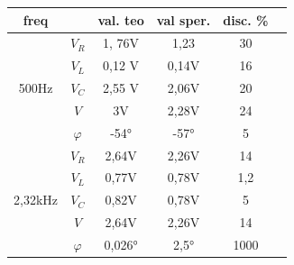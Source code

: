 \documentclass[12pt]{article}
\begin{document}
\begin{center}
    \begin{table}[!h]
        
    
    \begin{tabular}{|c|c|c|c|c|c|}
     \hline
       \rowcolor{nred} freq &  & val. teo & val sper. & disc. \%\\ \hline
       
      \multirow{5}{*}{500Hz} &\cellcolor{norange} $V_R$ & \cellcolor{norange}1, 76V& \cellcolor{norange}1,23&\cellcolor{norange} 30\\ \cline{2-5}
      
                            & \cellcolor{norange}$V_L$ &\cellcolor{norange} 0,12 V&\cellcolor{norange} 0,14V &\cellcolor{norange}16 \\ \cline{2-5}

                            & \cellcolor{norange}$V_C$ &\cellcolor{norange}2,55 V&\cellcolor{norange} 2,06V& \cellcolor{norange}20\\\cline{2-5}
     
                            &\cellcolor{norange} $V$   &\cellcolor{norange} 3V&\cellcolor{norange} 2,28V& \cellcolor{norange}24 \\\cline{2-5}

                            &\cellcolor{norange} $\varphi$ &\cellcolor{norange}-54° & \cellcolor{norange}-57°& \cellcolor{norange}5 \\\hline
    
                            \multirow{5}{*}{2,32kHz} &\cellcolor{nyellow} $V_R$ &\cellcolor{nyellow} 2,64V& \cellcolor{nyellow}2,26V& \cellcolor{nyellow}14\\\cline{2-5}
      
                            &\cellcolor{nyellow} $V_L$ &\cellcolor{nyellow} 0,77V& \cellcolor{nyellow}0,78V &\cellcolor{nyellow}1,2 \\\cline{2-5}
    
                            &\cellcolor{nyellow} $V_C$ &\cellcolor{nyellow}0,82V&\cellcolor{nyellow} 0,78V&\cellcolor{nyellow} 5\\\cline{2-5}
    
                            &\cellcolor{nyellow} $V$   &\cellcolor{nyellow} 2,64V&\cellcolor{nyellow} 2,26V&\cellcolor{nyellow} 14 \\\cline{2-5}
    
                            & \cellcolor{nyellow}$\varphi$ &\cellcolor{nyellow}0,026° &\cellcolor{nyellow} 2,5°& \cellcolor{nyellow}1000\\\hline
    

\end{tabular}
\end{table}
\end{center}
\end{document}
